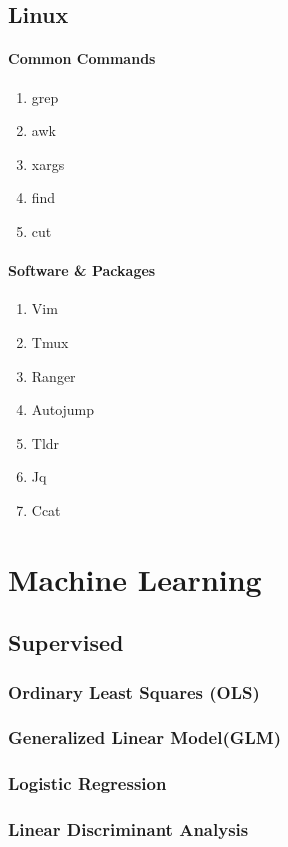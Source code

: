 \documentclass[11pt]{article}
\begin{document}
\subsection{Linux}

\paragraph{Common Commands}
\begin{enumerate}
  \item grep
  \item awk
  \item xargs
  \item find
  \item cut
\end{enumerate}

\paragraph{Software \& Packages}
\begin{enumerate}
  \item Vim
  \item Tmux
  \item Ranger
  \item Autojump
  \item Tldr
  \item Jq
  \item Ccat
\end{enumerate}

\section{Machine Learning}
\subsection{Supervised}
\subsubsection{Ordinary Least Squares (OLS)}
\subsubsection{Generalized Linear Model(GLM)}
\subsubsection{Logistic Regression}
\subsubsection{Linear Discriminant Analysis}
\end{document}
